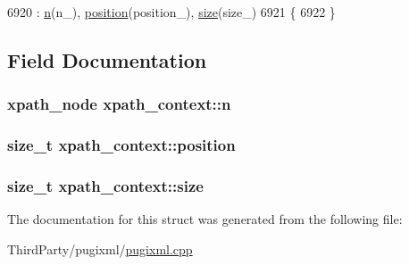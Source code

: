 \begin{DoxyCode}
6920                                                                            : \hyperlink{structxpath__context_ace8fbb8121820bc5054605c166101273}{n}(n\_), 
      \hyperlink{structxpath__context_add1fc9bd16b21d3a8d7a4bd63c60af07}{position}(position\_), \hyperlink{structxpath__context_a976ffb0eff84a7779c97e589c1785d1c}{size}(size\_)
6921         \{
6922         \}
\end{DoxyCode}


\subsection{Field Documentation}
\hypertarget{structxpath__context_ace8fbb8121820bc5054605c166101273}{
\subsubsection[{n}]{\setlength{\rightskip}{0pt plus 5cm}xpath\-\_\-node xpath\-\_\-context\-::n}}\label{structxpath__context_ace8fbb8121820bc5054605c166101273}
\hypertarget{structxpath__context_add1fc9bd16b21d3a8d7a4bd63c60af07}{
\subsubsection[{position}]{\setlength{\rightskip}{0pt plus 5cm}size\-\_\-t xpath\-\_\-context\-::position}}\label{structxpath__context_add1fc9bd16b21d3a8d7a4bd63c60af07}
\hypertarget{structxpath__context_a976ffb0eff84a7779c97e589c1785d1c}{
\subsubsection[{size}]{\setlength{\rightskip}{0pt plus 5cm}size\-\_\-t xpath\-\_\-context\-::size}}\label{structxpath__context_a976ffb0eff84a7779c97e589c1785d1c}


The documentation for this struct was generated from the following file\-:\begin{DoxyCompactItemize}
\item 
Third\-Party/pugixml/\hyperlink{pugixml_8cpp}{pugixml.\-cpp}\end{DoxyCompactItemize}
